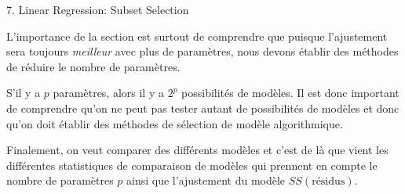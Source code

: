 \documentclass[12pt, titlepage, french]{report}
\begin{document}
\begin{CHPT_SUMM}{7. Linear Regression:  Subset Selection}
L'importance de la section est surtout de comprendre que puisque l'ajustement sera toujours \textit{meilleur} avec plus de paramètres, nous devons établir des méthodes de réduire le nombre de paramètres. 

S'il y a $p$ paramètres, alors il y a $2^{p}$ possibilités de modèles. Il est donc important de comprendre qu'on ne peut pas tester autant de possibilités de modèles et donc qu'on doit établir des méthodes de sélection de modèle algorithmique.

Finalement, on veut comparer des différents modèles et c'est de là que vient les différentes statistiques de comparaison de modèles qui prennent en compte le nombre de paramètres $p$ ainsi que l'ajustement du modèle $SS(\text{résidus})$.


\end{CHPT_SUMM}
\end{document}
